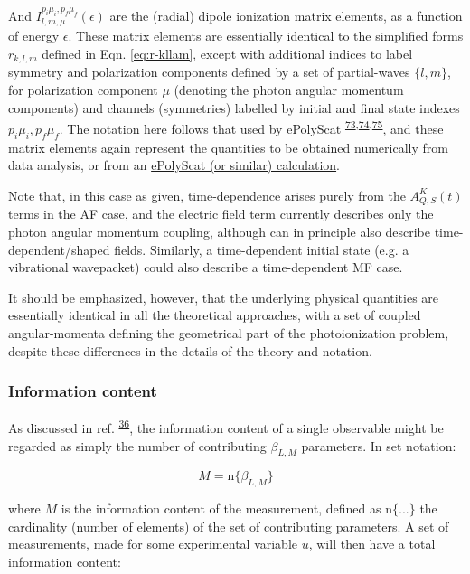 \documentclass[10pt]{article}
\begin{document}
And \(I_{l,m,\mu}^{p_{i}\mu_{i},p_{f}\mu_{f}}(\epsilon)\) are the (radial) dipole ionization matrix elements, as a function of energy \(\epsilon\). These matrix elements are essentially identical to the simplified forms $r_{k,l,m}$ defined in Eqn. \ref{eq:r-kllam}, except with additional indices to label symmetry and polarization components
defined by a set of partial-waves \(\{l,m\}\), for polarization component \(\mu\) (denoting the photon angular momentum components) and channels (symmetries) labelled by initial and final state indexes \({p_{i}\mu_{i},p_{f}\mu_{f}}\). The notation here follows that used by ePolyScat \textsuperscript{\hyperref[csl:73]{73},\hyperref[csl:74]{74},\hyperref[csl:75]{75}}, and these matrix elements again represent the quantities  to be obtained numerically from data analysis, or from an \href{https://epsproc.readthedocs.io/en/latest/ePS_ePSproc_tutorial/ePS_tutorial_080520.html\#Theoretical-background}{ePolyScat (or similar) calculation}. 

Note that, in this case as given, time-dependence arises purely from the \(A_{Q,S}^{K}(t)\) terms in the AF case, and the electric field term currently describes only the photon angular momentum coupling,
although can in principle also describe time-dependent/shaped fields. Similarly, a time-dependent initial state (e.g. a vibrational wavepacket) could also describe a time-dependent MF case.

It should be emphasized, however, that the underlying physical quantities are essentially identical in all the theoretical approaches, with a set of coupled angular-momenta defining the geometrical part of the photoionization problem, despite these differences in the details of the theory and notation. 




\subsubsection{Information content\label{sec:info-content}}

As discussed in ref. \textsuperscript{\hyperref[csl:36]{36}}, the information content of a single observable might be regarded as simply the number of contributing $\beta_{L,M}$ parameters. In set notation:

\begin{equation}
M=\mathrm{n}\{\beta_{L,M}\}
\end{equation}

where $M$ is the information content of the measurement, defined
as $\mathrm{n}\{...\}$ the cardinality (number of elements) of the
set of contributing parameters. A set of measurements, made for some
experimental variable $u$, will then have a total information content:
\end{document}
